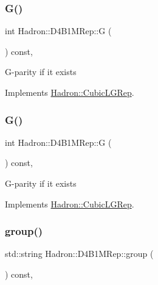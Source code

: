 \subsubsection{\texorpdfstring{G()}{G()}\hspace{0.1cm}{\footnotesize\ttfamily [2/3]}}
{\footnotesize\ttfamily int Hadron\+::\+D4\+B1\+M\+Rep\+::G (\begin{DoxyParamCaption}{ }\end{DoxyParamCaption}) const\hspace{0.3cm}{\ttfamily [inline]}, {\ttfamily [virtual]}}

G-\/parity if it exists 

Implements \mbox{\hyperlink{structHadron_1_1CubicLGRep_ace26f7b2d55e3a668a14cb9026da5231}{Hadron\+::\+Cubic\+L\+G\+Rep}}.

\mbox{\label{structHadron_1_1D4B1MRep_a43f4d688952f8690788611d18abc6d28}} 
\subsubsection{\texorpdfstring{G()}{G()}\hspace{0.1cm}{\footnotesize\ttfamily [3/3]}}
{\footnotesize\ttfamily int Hadron\+::\+D4\+B1\+M\+Rep\+::G (\begin{DoxyParamCaption}{ }\end{DoxyParamCaption}) const\hspace{0.3cm}{\ttfamily [inline]}, {\ttfamily [virtual]}}

G-\/parity if it exists 

Implements \mbox{\hyperlink{structHadron_1_1CubicLGRep_ace26f7b2d55e3a668a14cb9026da5231}{Hadron\+::\+Cubic\+L\+G\+Rep}}.

\mbox{\label{structHadron_1_1D4B1MRep_ad15b8741fcc6e6c63b0125b283dbbbab}} 
\subsubsection{\texorpdfstring{group()}{group()}\hspace{0.1cm}{\footnotesize\ttfamily [1/3]}}
{\footnotesize\ttfamily std\+::string Hadron\+::\+D4\+B1\+M\+Rep\+::group (\begin{DoxyParamCaption}{ }\end{DoxyParamCaption}) const\hspace{0.3cm}{\ttfamily [inline]}, {\ttfamily [virtual]}}

